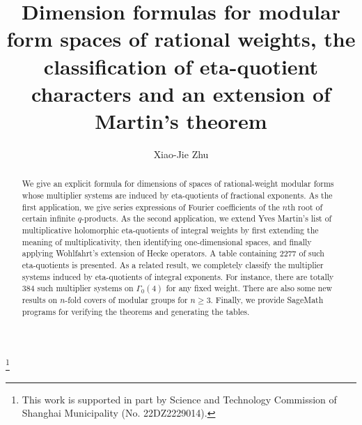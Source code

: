 \documentclass[12pt]{amsart}
\numberwithin{equation}{section}
\theoremstyle{plain}
\theoremstyle{definition}
\theoremstyle{remark}
\begin{document}

\baselineskip=17pt


\title[Dimension formulas for modular form spaces]{Dimension formulas for modular form spaces of rational weights, the classification of eta-quotient characters and an extension of Martin's theorem}

\author{Xiao-Jie Zhu}
\address{School of Mathematical Sciences\\
Key Laboratory of MEA (Ministry of Education) \& Shanghai Key Laboratory of PMMP\\
East China Normal University\\
500 Dongchuan Road, 200241\\
Shanghai, P. R. China}



\begin{abstract}
We give an explicit formula for dimensions of spaces of rational-weight modular forms whose multiplier systems are induced by eta-quotients of fractional exponents. As the first application, we give series expressions of Fourier coefficients of the $n$th root of certain infinite $q$-products. As the second application, we extend Yves Martin's list of multiplicative holomorphic eta-quotients of integral weights by first extending the meaning of multiplicativity, then identifying one-dimensional spaces, and finally applying Wohlfahrt's extension of Hecke operators. A table containing $2277$ of such eta-quotients is presented. As a related result, we completely classify the multiplier systems induced by eta-quotients of integral exponents. For instance, there are totally $384$ such multiplier systems on $\Gamma_0(4)$ for any fixed weight. There are also some new results on $n$-fold covers of modular groups for $n\geq3$. Finally, we provide SageMath programs for verifying the theorems and generating the tables.
\end{abstract}



\thanks{This work is supported in part by Science and Technology Commission of Shanghai Municipality (No. 22DZ2229014).}
\end{document}

